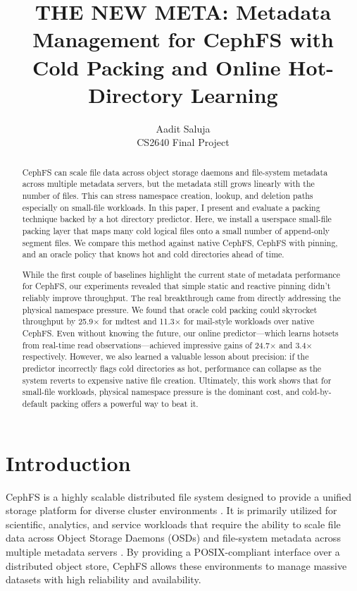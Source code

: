 \documentclass[letterpaper,twocolumn,10pt]{article}
\title{\Large \bf THE NEW META: Metadata Management for CephFS with Cold Packing and Online Hot-Directory Learning}
\author{
{\rm Aadit Saluja}\\
CS2640 Final Project
}
\begin{document}
\maketitle

\begin{abstract}
CephFS can scale file data across object storage daemons and file-system metadata across multiple metadata servers, but the metadata still grows linearly with the number of files. This can stress namespace creation, lookup, and deletion paths especially on small-file workloads. In this paper, I present and evaluate a packing technique backed by a hot directory predictor. Here, we install a userspace small-file packing layer that maps many cold logical files onto a small number of append-only segment files. We compare this method against native CephFS, CephFS with pinning, and an oracle policy that knows hot and cold directories ahead of time.

While the first couple of baselines highlight the current state of metadata performance for CephFS, our experiments revealed that simple static and reactive pinning didn't reliably improve throughput. The real breakthrough came from directly addressing the physical namespace pressure. We found that oracle cold packing could skyrocket throughput by 25.9$\times$ for mdtest and 11.3$\times$ for mail-style workloads over native CephFS. Even without knowing the future, our online predictor—which learns hotsets from real-time read observations—achieved impressive gains of 24.7$\times$ and 3.4$\times$ respectively. However, we also learned a valuable lesson about precision: if the predictor incorrectly flags cold directories as hot, performance can collapse as the system reverts to expensive native file creation. Ultimately, this work shows that for small-file workloads, physical namespace pressure is the dominant cost, and cold-by-default packing offers a powerful way to beat it.
\end{abstract}


\section{Introduction}

CephFS is a highly scalable distributed file system designed to provide a unified storage platform for diverse cluster environments \cite{cephfs}. It is primarily utilized for scientific, analytics, and service workloads that require the ability to scale file data across Object Storage Daemons (OSDs) and file-system metadata across multiple metadata servers \cite{cephfs, cephfs-multimds}. By providing a POSIX-compliant interface over a distributed object store, CephFS allows these environments to manage massive datasets with high reliability and availability.
\end{document}

